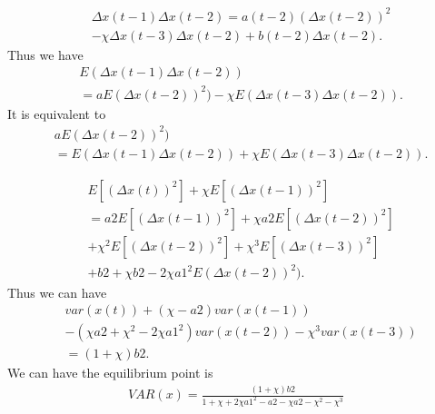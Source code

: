 \documentclass[12pt]{article}
\begin{document}
\begin{equation}
\label{eq:delta_t_1_2}
\begin{aligned}
& \Delta x(t-1) \Delta x(t-2) = a(t-2) ( \Delta x(t-2) )^{2} \\
& - \chi \Delta x(t-3) \Delta x(t-2) + b(t-2) \Delta x(t-2).
\end{aligned}
\end{equation}
Thus we have 
\begin{equation}
\label{eq:delta_t_1_2_mean}
\begin{aligned}
& E( \Delta x(t-1) \Delta x(t-2) ) \\
& = a E ( \Delta x(t-2) )^{2} ) - \chi E( \Delta x(t-3) \Delta x(t-2) ).
\end{aligned}
\end{equation}
It is equivalent to
\begin{equation}
\label{eq:delta_t_1_2_mean2}
\begin{aligned}
&  a E ( \Delta x(t-2) )^{2} )  \\
& = E( \Delta x(t-1) \Delta x(t-2) ) + \chi E( \Delta x(t-3) \Delta x(t-2) ).
\end{aligned}
\end{equation}

\begin{equation}
\label{eq:gene_minus}
\begin{aligned}
& E[ (\Delta x(t))^{2} ] + \chi E[ (\Delta x(t-1))^{2} ] \\
& = a2 E[ (\Delta x(t-1))^{2} ] + \chi a2 E[ (\Delta x(t-2))^{2} ] \\
& + \chi^{2} E[ (\Delta x(t-2))^{2} ] + \chi^{3} E[ (\Delta x(t-3))^{2} ] \\
& + b2 + \chi b2 - 2 \chi {a1}^{2} E( \Delta x(t-2) )^{2} ).
\end{aligned}
\end{equation}
Thus we can have
\begin{equation}
\begin{aligned}
& var(x(t)) + (\chi - a2) var(x(t-1)) \\
& - (\chi a2 + \chi^{2} - 2 \chi {a1}^{2} ) var(x(t-2)) - \chi^{3} var(x(t-3)) \\
& = (1+\chi) b2.
\end{aligned}
\end{equation}
We can have the equilibrium point is 
\begin{equation}
\label{eq:var_equilirium}
\begin{aligned}
VAR(x) = \frac{ (1+\chi) b2 }{ 1 + \chi + 2 \chi {a1}^{2} - a2 - \chi a2  - \chi^{2} - \chi^{3}  }
\end{aligned}
\end{equation}
\end{document}
